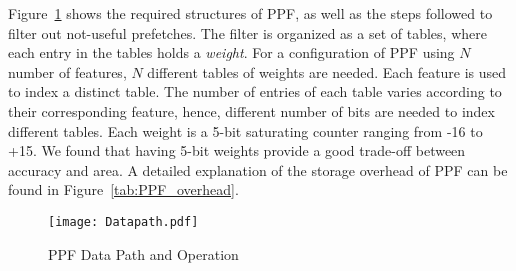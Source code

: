 Figure~\ref{fig:PPF_Datapath} shows the required structures of PPF, as well as
the steps followed to filter out not-useful prefetches.  The filter is
organized as a set of tables, where each entry in the tables holds a
\textit{weight}. For a configuration of PPF using $N$ number of features, $N$
different tables of weights are needed. Each feature is used to index a
distinct table. The number of entries of each table varies according to their
corresponding feature, hence, different number of bits are needed to index
different tables.  Each weight is a 5-bit saturating counter ranging from -16
to +15.  We found that having 5-bit weights provide a good trade-off between
accuracy and area. A detailed explanation of the storage overhead of PPF can
be found in Figure~\ref{tab:PPF_overhead}.

\begin{figure}
  \begin{center}
  \texttt{[image: Datapath.pdf]}
    \label{fig:PPF_Datapath}
  \caption{PPF Data Path and Operation}
  \end{center}
\end{figure}

